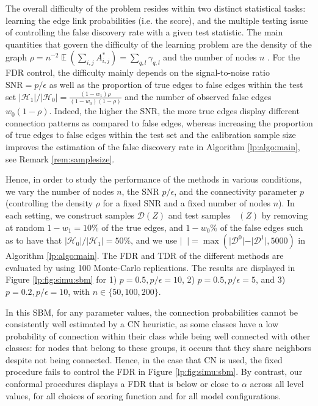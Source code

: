 \documentclass[a4paper, 11pt]{article}
\theoremstyle{remark}
\DeclareMathOperator{\E}{\mathbb{E}}
\DeclareMathOperator{\Dcal}{\cD_{\text{cal}}}
\DeclareMathOperator{\Dtest}{\cD_{\text{test}}}
\newcommand{\EM}{\ensuremath}
\newcommand{\cD}{\EM{\mathcal{D}}}
\newcommand{\cH}{\EM{\mathcal{H}}}
\begin{document}
The overall difficulty of the problem resides within two distinct statistical tasks: learning the edge link probabilities (i.e. the score), and the multiple testing issue of controlling the false discovery rate with a given test statistic. 
The main quantities that govern the difficulty of the learning problem are the density of the graph $\rho = n^{-2}\E(\sum_{i,j} A^*_{i,j}) = \sum_{q,l} \gamma_{q,l}$ and the number of nodes $n$ \citep{gaucher2021maximum}. For the FDR control, the difficulty mainly depends on the signal-to-noise ratio $\text{SNR} = p / \epsilon$ as well as the proportion of true edges to false edges within the test set $\vert \cH_1 \vert  /  \vert \cH_0 \vert = \frac{(1-w_1) \rho}{(1-w_0)(1-\rho)}$ and the 
number of observed false edges $w_0(1-\rho)$. 
Indeed, the higher the SNR, the more true edges display different connection patterns as compared to false edges, whereas increasing the proportion of true edges to false edges within the test set and the calibration sample size improves the estimation of the false discovery rate in Algorithm \ref{lp:algo:main}, see Remark \ref{rem:samplesize}.  



Hence, in order to study the performance of the methods in various conditions, we vary the number of nodes $n$, the SNR $p/ \epsilon$, and the connectivity parameter $p$ (controlling the density $\rho$ for a fixed SNR and a fixed number of nodes $n$). 
In each setting, we construct samples $\cD(Z)$ and test samples $\Dtest(Z)$ 
by removing at random $1-w_1 = 10\%$ of the true edges, and $1-w_0\%$ of the false edges such as to have that $\vert \cH_0 \vert / \vert \cH_1 \vert = 50\%$, and we use $\vert \Dcal \vert = \max( \vert \cD^0 \vert - \vert \cD^1 \vert, 5000)$ in Algorithm \ref{lp:algo:main}. The FDR and TDR of the different methods are evaluated by using 100 Monte-Carlo replications. 
The results are displayed in Figure \ref{lp:fig:simu:sbm} for 1) $p=0.5, p/\epsilon=10$, 2) $p=0.5, p/\epsilon=5$, and 3) $p=0.2, p/\epsilon=10$, with $n \in \{50, 100, 200 \}$.
 
 
In this SBM, for any parameter values, the connection probabilities cannot be consistently well estimated by a CN heuristic, as some classes have a low probability of connection within their class while being well connected with other classes: 
for nodes that belong to these groups, it occurs that they share neighbors despite not being connected. Hence, in the case that CN is used, the fixed procedure fails to control the FDR in Figure \ref{lp:fig:simu:sbm}. By contrast, our conformal procedures displays a FDR that is below or close to $\alpha$ across all level values, for all choices of scoring function and for all model configurations. 
\end{document}
